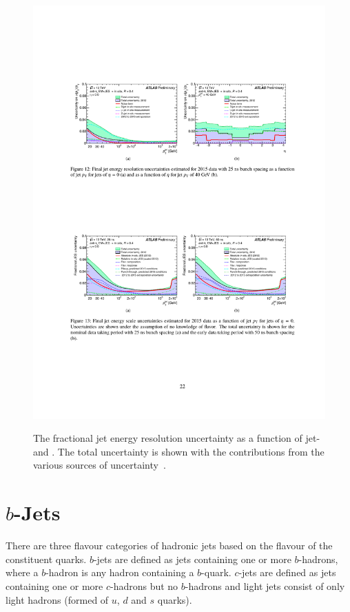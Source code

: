 \begin{figure}[!htb]
\begin{center}
     {\includegraphics[width=0.4\linewidth, angle=0]{figs/Objects/jets_uncert_JER_pt.pdf} }
 \end{center}
 \vspace{-1em}
  \caption[The fractional jet energy resolution uncertainty as a function of jet-\pT{} and \eta.]
          {\label{fig:obj-jets_calib_JER} The fractional jet energy resolution uncertainty as a function of jet-\pT{} and \eta.
            The total uncertainty is shown with the contributions from the various sources of uncertainty~\cite{obj-jets_calib_2015}.}
\end{figure}

\FloatBarrier

\section{$b$-Jets}
\label{sec:obj-bjets}

There are three flavour categories of hadronic jets based on the flavour of the constituent quarks.
$b$-jets are defined as jets containing one or more $b$-hadrons, where a $b$-hadron is any hadron containing a $b$-quark.
$c$-jets are defined as jets containing one or more $c$-hadrons but no $b$-hadrons
and light jets consist of only light hadrons (formed of $u$, $d$ and $s$ quarks).

